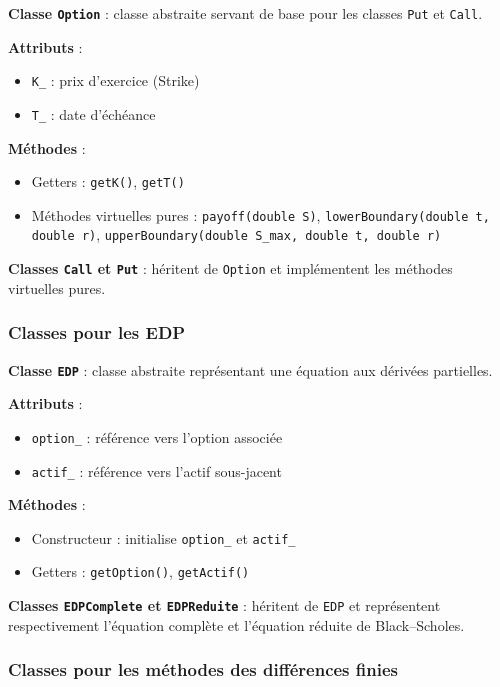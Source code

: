 \documentclass[12pt,a4paper]{article}
\begin{document}
\textbf{Classe \texttt{Option}} : classe abstraite servant de base pour les classes \texttt{Put} et \texttt{Call}.

\textbf{Attributs} :
\begin{itemize}
    \item \texttt{K\_} : prix d’exercice (Strike)
    \item \texttt{T\_} : date d’échéance
\end{itemize}

\textbf{Méthodes} :
\begin{itemize}
    \item Getters : \texttt{getK()}, \texttt{getT()}
    \item Méthodes virtuelles pures : \texttt{payoff(double S)}, \texttt{lowerBoundary(double t, double r)}, \texttt{upperBoundary(double S\_max, double t, double r)}
\end{itemize}

\textbf{Classes \texttt{Call} et \texttt{Put}} : héritent de \texttt{Option} et implémentent les méthodes virtuelles pures.

\subsubsection{Classes pour les EDP}

\textbf{Classe \texttt{EDP}} : classe abstraite représentant une équation aux dérivées partielles.

\textbf{Attributs} :
\begin{itemize}
    \item \texttt{option\_} : référence vers l’option associée
    \item \texttt{actif\_} : référence vers l’actif sous-jacent
\end{itemize}

\textbf{Méthodes} :
\begin{itemize}
    \item Constructeur : initialise \texttt{option\_} et \texttt{actif\_}
    \item Getters : \texttt{getOption()}, \texttt{getActif()}
\end{itemize}

\textbf{Classes \texttt{EDPComplete} et \texttt{EDPReduite}} : héritent de \texttt{EDP} et représentent respectivement l’équation complète et l’équation réduite de Black--Scholes.

\subsubsection{Classes pour les méthodes des différences finies}
\end{document}
